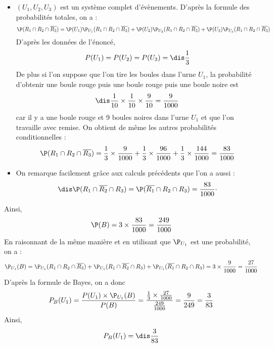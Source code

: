 \documentclass[a4paper,10pt]{report}
\begin{document}
\begin{itemize}
\item $(U_1,U_2,U_3)$ est un système complet d'évènements. D'après la formule des probabilités totales, on a : 
\[ \P( R_1 \cap R_2 \cap \overline{R_3}) = \P(U_1) \P_{U_1}( R_1 \cap R_2 \cap \overline{R_3}) + \P(U_2) \P_{U_2}( R_1 \cap R_2 \cap \overline{R_3}) + \P(U_3) \P_{U_3}( R_1 \cap R_2 \cap \overline{R_3}) \]
D'après les données de l'énoncé, 
$$P(U_1)= P(U_2)= P(U_3)= \dis \frac{1}{3}$$
De plus si l'on suppose que l'on tire les boules dans l'urne $U_1$, la probabilité d'obtenir une boule rouge puis une boule rouge puis une boule noire est 
$$\dis \frac{1}{10} \times \frac{1}{10} \times \frac{9}{10} = \frac{9}{1000}$$ car il y a une boule rouge et 9 boules noires dans l'urne $U_1$ et que l'on travaille avec remise. On obtient de même les autres probabilités conditionnelles :
\[ \P( R_1 \cap R_2 \cap \overline{R_3}) = \frac{1}{3} \times \frac{9}{1000} + \frac{1}{3} \times \frac{96}{1000} + \frac{1}{3} \times \frac{144}{1000} = \frac{83}{1000} \]
\item On remarque facilement grâce aux calculs précédents que l'on a aussi :
$$\dis \P(R_1 \cap \overline{R_2} \cap R_3) = \P(\overline{R_1} \cap R_2 \cap R_3) = \frac{83}{1000} \cdot$$
\end{itemize}
Ainsi, 
$$ \P(B) = 3 \times \frac{83}{1000} = \frac{249}{1000}$$
En raisonnant de la même manière et en utilisant que $\P_{U_1}$ est une probabilité, on a :
\[ \P_{U_1}(B) =  \P_{U_1}(R_1 \cap R_2 \cap \overline{R_3}) + \P_{U_1}(R_1 \cap \overline{R_2} \cap R_3) + \P_{U_1} (\overline{R_1} \cap R_2 \cap R_3) = 3 \times \frac{9}{1000} = \frac{27}{1000} \]
D'après la formule de Bayes, on a donc 
\[ P_{B}(U_1) = \frac{P(U_1) \times \P_{U_1}(B) }{P(B)} = \frac{\frac{1}{3} \times \frac{27}{1000}}{\frac{249}{1000}} = \frac{9}{249} = \frac{3}{83} \]
Ainsi,
$$ P_{B}(U_1) = \dis \frac{3}{83} $$
\end{document}

